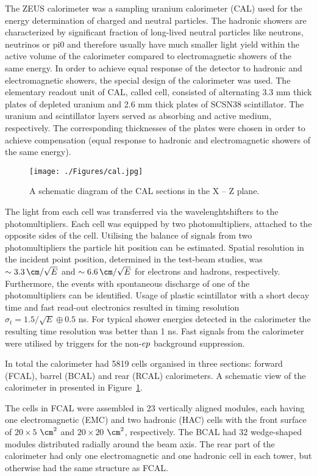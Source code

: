 The ZEUS calorimeter was a sampling uranium calorimeter (CAL) used for the energy determination of charged and neutral particles. 
The hadronic showers are characterized by significant fraction of long-lived neutral particles like neutrons, neutrinos or pi0 and therefore usually have much smaller light yield within the active volume of the calorimeter compared to electromagnetic showers of the same energy. In order to achieve equal response of the detector to hadronic and electromagnetic showers, the special design of the calorimeter was used. The elementary readout unit of CAL, called cell, consisted of alternating 3.3 mm thick plates of depleted uranium and 2.6 mm thick plates of SCSN38 scintillator. The uranium and scintillator layers served as absorbing and active medium, respectively. The corresponding thicknesses of the plates were chosen in order to achieve compensation (equal response to hadronic and electromagnetic showers of the same energy).

\begin{figure}[tpb]
	\centering
		\texttt{[image: ./Figures/cal.jpg]}
	\caption{A schematic diagram of the CAL sections in the X -- Z plane.}
	\label{fig:cal}
\end{figure}

The light from each cell was transferred via the wavelenghtshifters to the photomultipliers. Each cell was equipped by two photomultipliers, attached to the opposite sides of the cell. Utilising the balance of signals from two photomultipliers the particle hit position can be estimated. Spatial resolution in the incident point position, determined in the test-beam studies, was $\sim 3.3\,\cm/\sqrt{E}$ and $\sim 6.6\,\cm/\sqrt{E}$ for electrons and hadrons, respectively. Furthermore, the events with spontaneous discharge of one of the photomultipliers can be identified. Usage of plastic scintillator with a short decay time and fast read-out electronics resulted in timing resolution $\sigma_t = 1.5/\sqrt{E} \oplus 0.5$ ns. For typical shower energies detected in the calorimeter the resulting time resolution was better than 1 ns. Fast signals from the calorimeter were utilised by triggers for the non-$\mbox{$e p$}$ background suppression. 

In total the calorimeter had 5819 cells organised in three sections: forward (FCAL), barrel (BCAL) and rear (RCAL) calorimeters. A schematic view of the calorimeter in presented in Figure~\ref{fig:cal}.

The cells in FCAL were assembled in 23 vertically aligned modules, each having one electromagnetic (EMC) and two hadronic (HAC) cells with the front surface of $20 \times 5$ $\cm^2$ and $20 \times 20$ $\cm^2$, respectively. The BCAL had 32 wedge-shaped modules distributed radially around the beam axis. The rear part of the calorimeter had only one electromagnetic and one hadronic cell in each tower, but otherwise had the same structure as FCAL.

